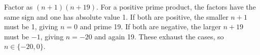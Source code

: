 Factor as $(n+1)(n+19)$. For a positive prime product, the factors have the same sign and one has absolute value 1. If both are positive, the smaller $ n+1 $ must be 1, giving $ n=0 $ and prime 19. If both are negative, the larger $ n+19 $ must be $-1 $, giving $ n=-20 $ and again 19. These exhaust the cases, so $\boxed{n\in\{-20,0\}}$.
